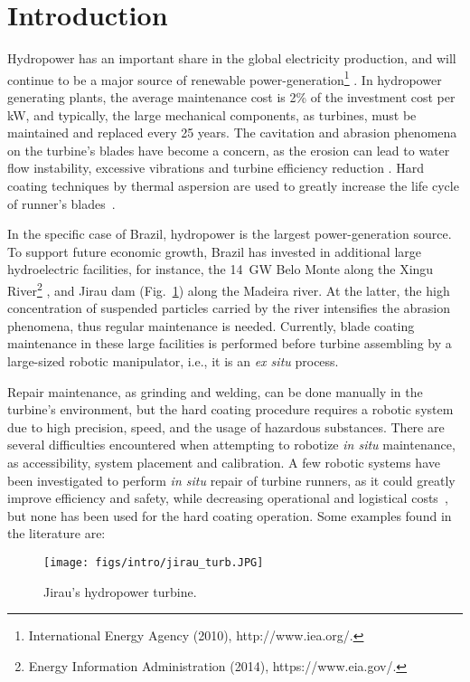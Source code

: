 \section{Introduction}

Hydropower has an important share in the global electricity production, and
will continue to be a major source of renewable
power-generation\footnote{International Energy Agency (2010), http://www.iea.org/.}%
. In hydropower generating plants, the average maintenance cost is 2\% of the
investment cost per kW, and typically, the large mechanical
components, as turbines, must be maintained and replaced every 25 years.
The cavitation and abrasion phenomena on the turbine's blades have become a
concern, as the erosion can lead to water flow instability, excessive
vibrations and turbine efficiency reduction \cite{goldemberg2007energia}. Hard
coating techniques by thermal aspersion are used to greatly increase the life
cycle of runner's blades~\cite{krella2011new}.

In the specific case of Brazil, hydropower is the largest
power-generation source. To support future economic growth, Brazil has
invested in additional large hydroelectric facilities, for instance, the
14~GW Belo Monte along the Xingu River\footnote{Energy
Information Administration (2014), https://www.eia.gov/.}%
, and Jirau dam (Fig.~\ref{fig::jirau_turb}) along the Madeira river. At the
latter, the high concentration of suspended particles carried by the river intensifies the abrasion phenomena, thus
regular maintenance is needed. Currently, blade coating maintenance in these
large facilities is performed before turbine assembling by a large-sized
robotic manipulator, i.e., it is an \textit{ex situ} process. 

Repair maintenance, as grinding and welding, can be done manually in the
turbine's environment, but the hard coating procedure requires a robotic system
due to high precision, speed, and the usage of hazardous substances.
There are several difficulties encountered when attempting to robotize
\textit{in situ} maintenance, as accessibility, system placement and
calibration. A few robotic systems have been investigated to perform \textit{in
situ} repair of turbine runners, as it could greatly improve efficiency and
safety, while decreasing operational and logistical
costs~\cite{hazel2012field}, but none has been used for the hard coating operation. Some examples found in the literature are:

\begin{figure}[h!]
\centering
	\texttt{[image: figs/intro/jirau\_turb.JPG]} 
	\caption{Jirau's hydropower turbine.}
	\label{fig::jirau_turb}
\end{figure}

